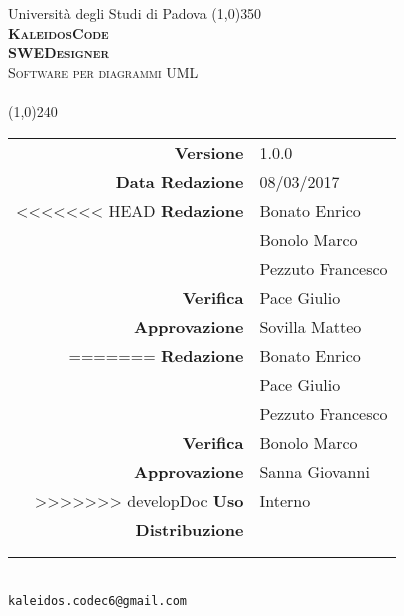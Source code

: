 \documentclass[a4paper,12pt]{article}
\author{KaleidosCode}
\date{08/03/2017}	%
\begin{document}
	\begin{titlepage}
		\centering Università degli Studi di Padova
		\line(1,0){350}\\
		\vspace{0.4cm}
		{\bfseries\scshape\LARGE KaleidosCode\\}
		\vspace{0.4cm}
		{\bfseries\scshape\LARGE SWEDesigner\\}
		{\scshape\Large Software per diagrammi UML\\}
		\vspace{1cm}
		{\scshape\Large \studiodifattibilitai\ \\}		%
		\vspace{1.4cm}
		\logo
		\vspace{1.2cm}
		\line(1,0){240}\\
		\begin{tabular}{r|l}
			{\hfill \textbf{Versione}} 			& 1.0.0\\
			{\hfill \textbf{Data Redazione}} 	& 08/03/2017\\	%
<<<<<<< HEAD
			{\hfill \textbf{Redazione}} 		& Bonato Enrico\\ & Bonolo Marco\\ & Pezzuto Francesco\\
			{\hfill \textbf{Verifica}} 			& Pace Giulio\\
			{\hfill \textbf{Approvazione}} 		& Sovilla Matteo\\
=======
			{\hfill \textbf{Redazione}} 		& Bonato Enrico\\ & Pace Giulio\\ & Pezzuto Francesco\\
			{\hfill \textbf{Verifica}} 			& Bonolo Marco\\
			{\hfill \textbf{Approvazione}} 		& Sanna Giovanni\\
>>>>>>> developDoc
			{\hfill \textbf{Uso}} 				& Interno\\
			{\hfill \textbf{Distribuzione}} 	& \vardanega \\ & \cardin \\ & \proponente\\
		\end{tabular}\\
		\vspace{2cm}
		\texttt{kaleidos.codec6@gmail.com}
	\end{titlepage}

	\pagestyle{myfront}
	\newpage
		
	\newpage
		\tableofcontents
	\pagestyle{mymain}
	\newpage
		
	\newpage
		
	\newpage
		
	\newpage
		
	\newpage
		
	\newpage
		
	\newpage
		

	\label{LastPage}
\end{document}
